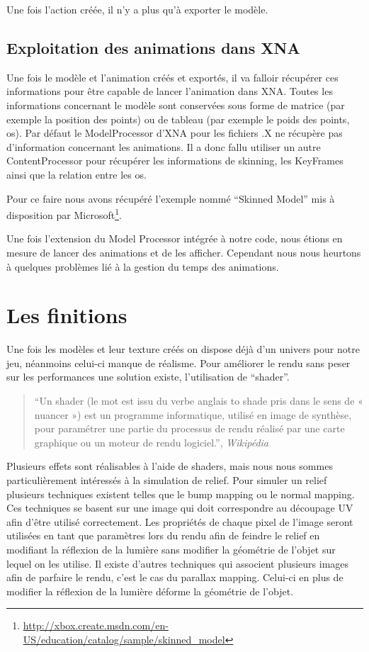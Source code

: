 \documentclass[11pt]{report}
\begin{document}
Une fois l’action créée, il n’y a plus qu’à exporter le modèle.

\subsection{Exploitation des animations dans XNA}

Une fois le modèle et l’animation créés et exportés, il va falloir récupérer ces informations pour être capable de lancer l’animation dans XNA. Toutes les informations concernant le modèle sont conservées sous forme de matrice (par exemple la position des points) ou de tableau (par exemple le poids des points, os). 
Par défaut le ModelProcessor d’XNA pour les fichiers .X ne récupère pas d’information concernant les animations. Il a donc fallu utiliser un autre ContentProcessor pour récupérer les informations de skinning, les  KeyFrames ainsi que la relation entre les os.

Pour ce faire nous avons récupéré l'exemple nommé ``Skinned Model'' mis à disposition par Microsoft\footnote{\url{http://xbox.create.msdn.com/en-US/education/catalog/sample/skinned_model}}.

Une fois l’extension du Model Processor intégrée à notre code, nous étions en mesure de lancer des animations et de les afficher. Cependant nous nous heurtons à quelques problèmes lié à la gestion du temps des animations.

\section{Les finitions}

Une fois les modèles et leur texture créés on dispose déjà d’un univers pour notre jeu, néanmoins celui-ci manque de réalisme. Pour améliorer le rendu sans peser sur les performances une solution existe, l’utilisation de ``shader''.

\begin{quote}
``Un shader (le mot est issu du verbe anglais to shade pris dans le sens de « nuancer ») est un programme informatique, utilisé en image de synthèse, pour paramétrer une partie du processus de rendu réalisé par une carte graphique ou un moteur de rendu logiciel.'', \emph{Wikipédia}
\end{quote}

Plusieurs effets sont réalisables à l’aide de shaders, mais nous nous sommes particulièrement intéressés à la simulation de relief. Pour simuler un relief plusieurs techniques existent telles que le bump mapping ou le normal mapping. Ces techniques se basent sur une image qui doit correspondre au découpage UV afin d’être utilisé correctement. Les propriétés de chaque pixel de l’image seront utilisées en tant que paramètres lors du rendu afin de feindre le relief en modifiant la réflexion de la lumière sans modifier la géométrie de l’objet sur lequel on les utilise. Il existe d’autres techniques qui associent plusieurs images afin de parfaire le rendu, c’est le cas du parallax mapping. Celui-ci en plus de modifier la réflexion de la lumière déforme la géométrie de l’objet.
\end{document}
